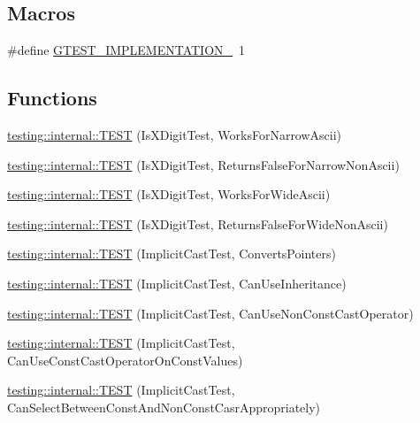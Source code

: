 \subsection*{Macros}
\begin{DoxyCompactItemize}
\item 
\#define \hyperlink{gtest-port__test_8cc_a83bd232fd1077579fada92c31bb7469f}{G\-T\-E\-S\-T\-\_\-\-I\-M\-P\-L\-E\-M\-E\-N\-T\-A\-T\-I\-O\-N\-\_\-}~1
\end{DoxyCompactItemize}
\subsection*{Functions}
\begin{DoxyCompactItemize}
\item 
\hyperlink{namespacetesting_1_1internal_a0c1e055c001e4dbb874f00a46c25bb00}{testing\-::internal\-::\-T\-E\-S\-T} (Is\-X\-Digit\-Test, Works\-For\-Narrow\-Ascii)
\item 
\hyperlink{namespacetesting_1_1internal_a7cd9d67d4164d2aeb4ceb3ed253c7d2d}{testing\-::internal\-::\-T\-E\-S\-T} (Is\-X\-Digit\-Test, Returns\-False\-For\-Narrow\-Non\-Ascii)
\item 
\hyperlink{namespacetesting_1_1internal_af76bca685fddffc0ecda1464b1b6a0a4}{testing\-::internal\-::\-T\-E\-S\-T} (Is\-X\-Digit\-Test, Works\-For\-Wide\-Ascii)
\item 
\hyperlink{namespacetesting_1_1internal_a771232ed3801fa49cbd4bbe11b318fe3}{testing\-::internal\-::\-T\-E\-S\-T} (Is\-X\-Digit\-Test, Returns\-False\-For\-Wide\-Non\-Ascii)
\item 
\hyperlink{namespacetesting_1_1internal_a5d2ec1128c80363b06070f403f682490}{testing\-::internal\-::\-T\-E\-S\-T} (Implicit\-Cast\-Test, Converts\-Pointers)
\item 
\hyperlink{namespacetesting_1_1internal_a1b304dcd3ac71095f2e7d9e9b43c4755}{testing\-::internal\-::\-T\-E\-S\-T} (Implicit\-Cast\-Test, Can\-Use\-Inheritance)
\item 
\hyperlink{namespacetesting_1_1internal_a8554484c7c0ea536bc393c254490aaff}{testing\-::internal\-::\-T\-E\-S\-T} (Implicit\-Cast\-Test, Can\-Use\-Non\-Const\-Cast\-Operator)
\item 
\hyperlink{namespacetesting_1_1internal_af7f631f9fbde27b19a65d50fc29e1420}{testing\-::internal\-::\-T\-E\-S\-T} (Implicit\-Cast\-Test, Can\-Use\-Const\-Cast\-Operator\-On\-Const\-Values)
\item 
\hyperlink{namespacetesting_1_1internal_a62a3b62658f9d47733cb7b5c8f69b2ad}{testing\-::internal\-::\-T\-E\-S\-T} (Implicit\-Cast\-Test, Can\-Select\-Between\-Const\-And\-Non\-Const\-Casr\-Appropriately)

\end{DoxyCompactItemize}
